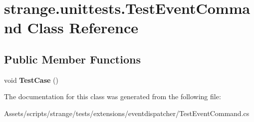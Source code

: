 \hypertarget{classstrange_1_1unittests_1_1_test_event_command}{\section{strange.\-unittests.\-Test\-Event\-Command Class Reference}
\label{classstrange_1_1unittests_1_1_test_event_command}
}
\subsection*{Public Member Functions}
\begin{DoxyCompactItemize}
\item 
\hypertarget{classstrange_1_1unittests_1_1_test_event_command_a952d6c75028ecc8d85a845b14e3a61e4}{void {\bfseries Test\-Case} ()}\label{classstrange_1_1unittests_1_1_test_event_command_a952d6c75028ecc8d85a845b14e3a61e4}

\end{DoxyCompactItemize}


The documentation for this class was generated from the following file\-:\begin{DoxyCompactItemize}
\item 
Assets/scripts/strange/tests/extensions/eventdispatcher/Test\-Event\-Command.\-cs\end{DoxyCompactItemize}
